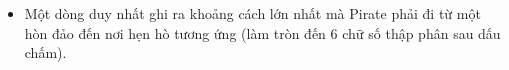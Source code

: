 \begin{itemize}
	\item     Một dòng duy nhất ghi ra khoảng cách lớn nhất mà Pirate phải đi từ một hòn đảo đến nơi hẹn hò tương ứng (làm tròn đến 6 chữ số thập phân sau dấu chấm).   
\end{itemize}